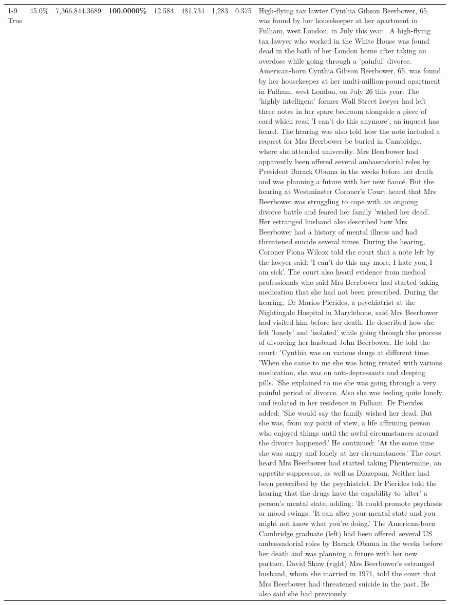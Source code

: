 \begin{table}[H]
\begin{tabular}{lllrlllll}
\cline{1-9}
True & 45.0\% & 7,366,844.3689 & \bfseries \color{red} 100.0000\% & 12.584 & 481.734 & 1,283 & 0.375 & High-flying tax lawter Cynthia Gibson Beerbower, 65, was found by her housekeeper at her apartment in Fulham, west London, in July this year . A high-flying tax lawyer who worked in the White House was found dead in the bath of her London home after taking an overdose while going through a 'painful' divorce. American-born Cynthia Gibson Beerbower, 65, was found by her housekeeper at her multi-million-pound apartment in Fulham, west London, on July 26 this year. The 'highly intelligent' former Wall Street lawyer had left three notes in her spare bedroom alongside a piece of card which read 'I can't do this anymore', an inquest has heard. The hearing was also told how the note included a request for Mrs Beerbower be buried in Cambridge, where she attended university. Mrs Beerbower had apparently been offered several ambassadorial roles by President Barack Obama in the weeks before her death and was planning a future with her new fiancé. But the hearing at Westminster Coroner's Court heard that Mrs Beerbower was struggling to cope with an ongoing divorce battle and feared her family 'wished her dead'. Her estranged husband also described how Mrs Beerbower had a history of mental illness and had threatened suicide several times. During the hearing, Coroner Fiona Wilcox told the court that a note left by the lawyer said: 'I can't do this any more, I hate you, I am sick'. The court also heard evidence from medical professionals who said Mrs Beerbower had started taking medication that she had not been prescribed. During the hearing, Dr Marios Pierides, a psychiatrist at the Nightingale Hospital in Marylebone, said Mrs Beerbower had visited him before her death. He described how she felt 'lonely' and 'isolated' while going through the process of divorcing her husband John Beerbower. He told the court: 'Cynthia was on various drugs at different time. 'When she came to me she was being treated with various medication, she was on anti-depressants and sleeping pills. 'She explained to me she was going through a very painful period of divorce. Also she was feeling quite lonely and isolated in her residence in Fulham. Dr Pierides added: 'She would say the family wished her dead. But she was, from my point of view, a life affirming person who enjoyed things until the awful circumstances around the divorce happened.' He continued: 'At the same time she was angry and lonely at her circumstances.' The court heard Mrs Beerbower had started taking Phentermine, an appetite suppressor, as well as Diazepam. Neither had been prescribed by the psychiatrist. Dr Pierides told the hearing that the drugs have the capability to 'alter' a person's mental state, adding: 'It could promote psychosis or mood swings. 'It can alter your mental state and you might not know what you're doing.' The American-born Cambridge graduate (left) had been offered several US ambassadorial roles by Barack Obama in the weeks before her death and was planning a future with her new partner, David Shaw (right) Mrs Beerbower's estranged husband, whom she married in 1971, told the court that Mrs Beerbower had threatened suicide in the past. He also said she had previously 
\end{tabular}
\end{table}
